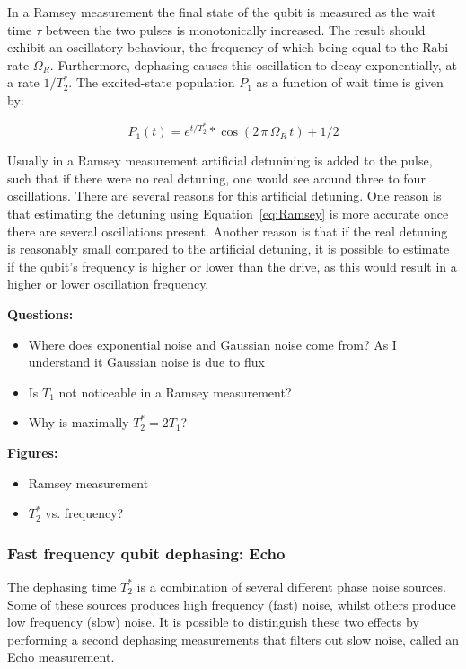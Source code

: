           In a Ramsey measurement the final state of the qubit is measured as the wait time $\tau$ between the two pulses is monotonically increased. The result should exhibit an oscillatory behaviour, the frequency of which being equal to the Rabi rate $\Omega_R$. Furthermore, dephasing causes this oscillation to decay exponentially, at a rate $1/T_2^*$. The excited-state population $P_1$ as a function of wait time is given by:

          \begin{equation}
            P_1(t) = e^{t/T_2^*} * \cos{\left( 2 \, \pi \, \Omega_R \, t \right) + 1/2}
            \label{eq:Ramsey}
          \end{equation}

          Usually in a Ramsey measurement artificial detunining is added to the pulse, such that if there were no real detuning, one would see around three to four oscillations. There are several reasons for this artificial detuning. One reason is that estimating the detuning using Equation~\ref{eq:Ramsey} is more accurate once there are several oscillations present. Another reason is that if the real detuning is reasonably small compared to the artificial detuning, it is possible to estimate if the qubit's frequency is higher or lower than the drive, as this would result in a higher or lower oscillation frequency.



          \textbf{Questions:}
          \begin{itemize}
            \item Where does exponential noise and Gaussian noise come from? As I understand it Gaussian noise is due to flux
            \item Is $T_1$ not noticeable in a Ramsey measurement?
            \item Why is maximally $T_2^*=2T_1$?
          \end{itemize}

          \textbf{Figures:}
          \begin{itemize}
            \item Ramsey measurement
            \item $T_2^*$ vs. frequency?
          \end{itemize}

        \subsubsection{Fast frequency qubit dephasing: Echo}
          The dephasing time $T_2^*$ is a combination of several different phase noise sources. Some of these sources produces high frequency (fast) noise, whilst others produce low frequency (slow) noise. It is possible to distinguish these two effects by performing a second dephasing measurements that filters out slow noise, called an Echo measurement.

